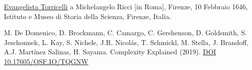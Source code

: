 
\cleardoublepage
{}
\begin{thebibliography}{99}

%
%

\href{http://www.imss.fi.it/multi/torricel/le100246.html}{Evangelista Torricelli} a Michelangelo Ricci [in Roma], Firenze, 10 Febbraio 1646,
Istituto e Museo di Storia della Scienza, Firenze, Italia.

M. De Domenico, D. Brockmann, C. Camargo, C. Gershenson, D. Goldsmith, S. Jeschonnek, L. Kay, S. Nichele, J.R. Nicolás, T. Schmickl, M. Stella, J. Brandoff, A.J. Martínez Salinas, H. Sayama. Complexity Explained (2019). \href{https://complexityexplained.github.io/}{DOI 10.17605/OSF.IO/TQGNW}



 
 

\end{thebibliography}
